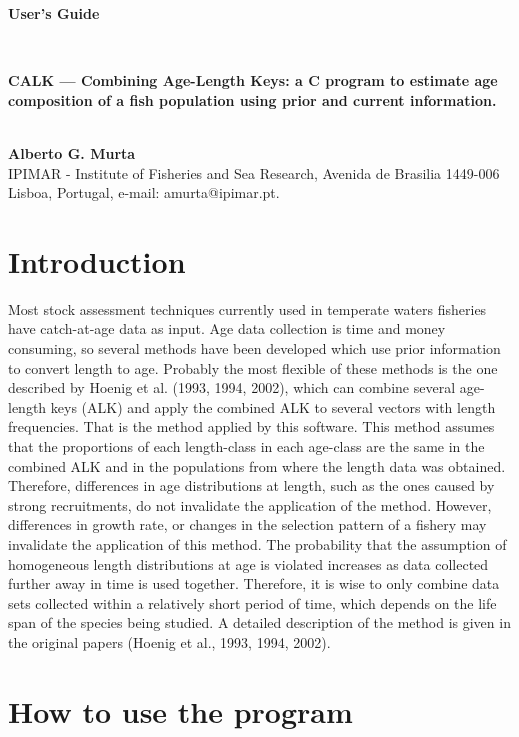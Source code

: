 \documentclass[12pt,a4paper]{article}
\begin{document}
\begin{center}
\begin{LARGE} 
\textbf{User's Guide}
\end{LARGE}
\\
\vspace{1cm}
\begin{large}
\textbf{CALK — Combining Age-Length Keys: a C program to estimate age composition of a fish population using prior and current information.}
\end{large}
\\
\vspace{1cm}
\textbf{Alberto G. Murta}
\\
IPIMAR - Institute of Fisheries and Sea Research, Avenida de Brasilia 1449-006 Lisboa, Portugal, e-mail: amurta@ipimar.pt.
\end{center}

\section{Introduction}

Most stock assessment techniques currently used in temperate waters fisheries have catch-at-age data as input. Age data collection is time
 and money consuming, so several methods have been developed which use prior information to convert length to age. Probably the most 
flexible of these methods is the one described by Hoenig et al. (1993, 1994, 2002), which can combine several age-length keys (ALK) and apply
 the combined ALK to several vectors with length frequencies. That is the method applied by this software. 
This method assumes that the proportions of each length-class in 
each age-class are the same in the combined ALK and in the populations 
from where the length data was obtained. Therefore, differences in age distributions at length, such as the ones caused by strong recruitments,
 do not invalidate the application of the method. However, differences in growth rate, or changes in the selection pattern of a fishery may 
invalidate the application of this method. The probability that the assumption of homogeneous length distributions at age is violated increases
 as data collected further away in time is used together. Therefore, it is wise to only combine data sets collected within a relatively short
 period of time, which depends on the life span of the species being studied. 
 A detailed description of the method is given in the original papers (Hoenig et al., 1993, 1994, 2002).

\section{How to use the program}
\end{document}
